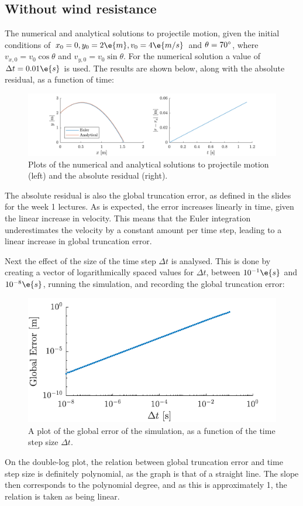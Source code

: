 \documentclass[a4paper,10pt]{article} 	%
\numberwithin{equation}{section}
\begin{document}
	\subsection{Without wind resistance}
	The numerical and analytical solutions to projectile motion, given the initial conditions of $ x_0 = 0,y_0 = 2 \e{m},v_0 = 4 \e{m/s}$ and $ \theta = 70\degree$, where $ v_{x,0} = v_0 \cos \theta $ and $ v_{y,0} = v_0 \sin \theta $. For the numerical solution a value of $ \Delta t = 0.01 \e{s}$ is used. The results are shown below, along with the absolute residual, as a function of time:
	\begin{figure}[H]
		\centering
		\includegraphics[width=\linewidth]{projectile.pdf}
		\caption{Plots of the numerical and analytical solutions to projectile motion (left) and the absolute residual (right).}
		\label{fig:projectile}
	\end{figure}
	The absolute residual is also the global truncation error, as defined in the slides for the week 1 lectures. As is expected, the error increases linearly in time, given the linear increase in velocity. This means that the Euler integration underestimates the velocity by a constant amount per time step, leading to a linear increase in global truncation error.
	
	
	Next the effect of the size of the time step $ \Delta t $ is analysed. This is done by creating a vector of logarithmically spaced values for $ \Delta t $, between $ 10^{-1} \e{s} $ and $ 10^{-8} \e{s}$, running the simulation, and recording the global truncation error:
	\begin{figure}[H]
		\centering
		\includegraphics[width=0.5\linewidth]{projError.pdf}
		\caption{A plot of the global error of the simulation, as a function of the time step size $ \Delta t $.}
		\label{fig:projError}
	\end{figure}
	On the double-log plot, the relation between global truncation error and time step size is definitely polynomial, as the graph is that of a straight line. The slope then corresponds to the polynomial degree, and as this is approximately 1, the relation is taken as being linear.
	
\end{document}
